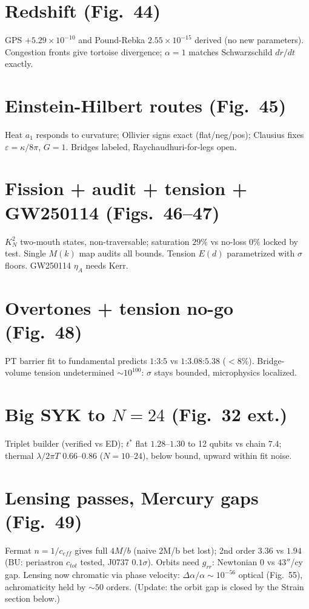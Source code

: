 \documentclass[11pt]{article}
\begin{document}
\section{Redshift (Fig.~44)}
GPS $+5.29\times10^{-10}$ and Pound-Rebka $2.55\times10^{-15}$ derived
(no new parameters). Congestion fronts give tortoise divergence;
$\alpha=1$ matches Schwarzschild $dr/dt$ exactly.

\section{Einstein-Hilbert routes (Fig.~45)}
Heat $a_1$ responds to curvature; Ollivier signs exact (flat/neg/pos);
Clausius fixes $\varepsilon=\kappa/8\pi$, $G=1$. Bridges labeled,
Raychaudhuri-for-legs open.

\section{Fission + audit + tension + GW250114 (Figs.~46--47)}
$K_N^2$ two-mouth states, non-traversable; saturation $29\%$ vs no-loss
$0\%$ locked by test. Single $M(k)$ map audits all bounds. Tension
$E(d)$ parametrized with $\sigma$ floors. GW250114 $\eta_A$ needs Kerr.

\section{Overtones + tension no-go (Fig.~48)}
PT barrier fit to fundamental predicts $1$:$3$:$5$ vs $1$:$3.08$:$5.38$
($<8\%$). Bridge-volume tension undetermined $\sim10^{100}$: $\sigma$
stays bounded, microphysics localized.

\section{Big SYK to $N=24$ (Fig.~32 ext.)}
Triplet builder (verified vs ED); $t^*$ flat $1.28$--$1.30$ to 12 qubits
vs chain $7.4$; thermal $\lambda/2\pi T$ $0.66$--$0.86$ ($N=10$--$24$),
below bound, upward within fit noise.

\section{Lensing passes, Mercury gaps (Fig.~49)}
Fermat $n=1/c_{eff}$ gives full $4M/b$ (naive 2M/b bet lost); 2nd order
$3.36$ vs $1.94$ (BU: periastron $c_{tot}$ tested, J0737 $0.1\sigma$). Orbits need $g_{rr}$: Newtonian $0$ vs $43''$/cy gap.
Lensing now chromatic via phase velocity: $\Delta\alpha/\alpha\sim10^{-56}$
optical (Fig.~55), achromaticity held by $\sim50$ orders. (Update: the orbit
gap is closed by the Strain section below.)
\end{document}
